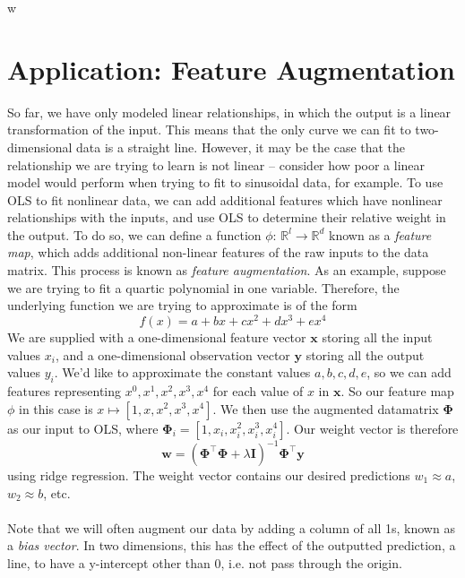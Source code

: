 w\documentclass{article}
\begin{document}
\section*{Application: Feature Augmentation}
So far, we have only modeled linear relationships, in which the output is a linear transformation of the input. This means that the only curve we can fit to two-dimensional data is a straight line. However, it may be the case that the relationship we are trying to learn is not linear -- consider how poor a linear model would perform when trying to fit to sinusoidal data, for example. To use OLS to fit nonlinear data, we can add additional features which have nonlinear relationships with the inputs, and use OLS to determine their relative weight in the output. To do so, we can define a function $\phi$: $\mathbb{R}^l \rightarrow \mathbb{R}^d$ known as a \textit{feature map}, which adds additional non-linear features of the raw inputs to the data matrix. This process is known as \textit{feature augmentation}. As an example, suppose we are trying to fit a quartic polynomial in one variable. Therefore, the underlying function we are trying to approximate is of the form $$f(x) = a + bx + cx^2 + dx^3 + ex^4$$ We are supplied with a one-dimensional feature vector $\mathbf{x}$ storing all the input values $x_i$, and a one-dimensional observation vector $\mathbf{y}$ storing all the output values $y_i$. We'd like to approximate the constant values $a, b, c, d, e$, so we can add features representing $x^0, x^1, x^2, x^3, x^4$ for each value of $x$ in $\mathbf{x}$. So our feature map $\phi$ in this case is $x \mapsto [1, x, x^2, x^3, x^4]$. We then use the augmented datamatrix $\mathbf{\Phi}$ as our input to OLS, where $\mathbf{\Phi}_i = [1, x_i, x_i^2, x_i^3, x_i^4]$. Our weight vector is therefore $$\mathbf{w} = (\mathbf{\Phi^{\top}\Phi} + \lambda\mathbf{I})^{-1}\mathbf{\Phi^{\top}y}$$ using ridge regression. The weight vector contains our desired predictions $w_1 \approx a$, $w_2 \approx b$, etc. \\\\
Note that we will often augment our data by adding a column of all 1s, known as a \textit{bias vector}. In two dimensions, this has the effect of the outputted prediction, a line, to have a y-intercept other than 0, i.e. not pass through the origin.

\clearpage
\end{document}

